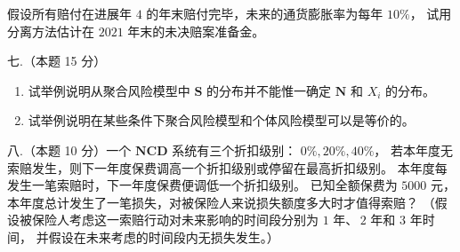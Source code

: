 假设所有赔付在进展年 $4$ 的年末赔付完毕，未来的通货膨胀率为每年 $10 \%$，
试用分离方法估计在 $2021$ 年末的未决赔案准备金。

七.（本题 15 分）
\begin{enumerate}[label=(\arabic*)]
\item 试举例说明从聚合风险模型中 $\mathbf{S}$ 的分布并不能惟一确定 $\mathbf{N}$ 和 $X_{i}$ 的分布。
\item 试举例说明在某些条件下聚合风险模型和个体风险模型可以是等价的。
\end{enumerate}

八.（本题 10 分）一个 $\mathbf{NCD}$ 系统有三个折扣级别： $0 \%, 20 \%, 40 \%$，
若本年度无索赔发生，则下一年度保费调高一个折扣级别或停留在最高折扣级别。
本年度每发生一笔索赔时，下一年度保费便调低一个折扣级别。
已知全额保费为 $5000$ 元，本年度总计发生了一笔损失，对被保险人来说损失额度多大时才值得索赔？
（假设被保险人考虑这一索赔行动对未来影响的时间段分别为 $1$ 年、\,$2$ 年和 $3$ 年时间，
并假设在未来考虑的时间段内无损失发生。）